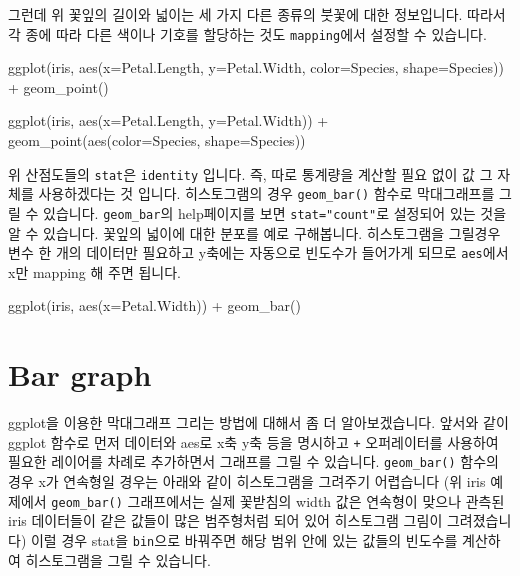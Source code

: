 \documentclass[
]{book}
\newenvironment{Shaded}{\begin{snugshade}}{\end{snugshade}}
\newcommand{\AttributeTok}[1]{\textcolor[rgb]{0.77,0.63,0.00}{#1}}
\newcommand{\FunctionTok}[1]{\textcolor[rgb]{0.00,0.00,0.00}{#1}}
\newcommand{\NormalTok}[1]{#1}
\newcommand{\SpecialCharTok}[1]{\textcolor[rgb]{0.00,0.00,0.00}{#1}}
\begin{document}
그런데 위 꽃잎의 길이와 넓이는 세 가지 다른 종류의 붓꽃에 대한 정보입니다. 따라서 각 종에 따라 다른 색이나 기호를 할당하는 것도 \texttt{mapping}에서 설정할 수 있습니다.

\begin{Shaded}
\begin{Highlighting}[]
\FunctionTok{ggplot}\NormalTok{(iris, }\FunctionTok{aes}\NormalTok{(}\AttributeTok{x=}\NormalTok{Petal.Length, }
                 \AttributeTok{y=}\NormalTok{Petal.Width, }
                 \AttributeTok{color=}\NormalTok{Species, }
                 \AttributeTok{shape=}\NormalTok{Species)) }\SpecialCharTok{+} 
  \FunctionTok{geom\_point}\NormalTok{()}

\FunctionTok{ggplot}\NormalTok{(iris, }\FunctionTok{aes}\NormalTok{(}\AttributeTok{x=}\NormalTok{Petal.Length, }\AttributeTok{y=}\NormalTok{Petal.Width)) }\SpecialCharTok{+} 
  \FunctionTok{geom\_point}\NormalTok{(}\FunctionTok{aes}\NormalTok{(}\AttributeTok{color=}\NormalTok{Species, }\AttributeTok{shape=}\NormalTok{Species))}
\end{Highlighting}
\end{Shaded}

위 산점도들의 \texttt{stat}은 \texttt{identity} 입니다. 즉, 따로 통계량을 계산할 필요 없이 값 그 자체를 사용하겠다는 것 입니다. 히스토그램의 경우 \texttt{geom\_bar()} 함수로 막대그래프를 그릴 수 있습니다. \texttt{geom\_bar}의 help페이지를 보면 \texttt{stat="count"}로 설정되어 있는 것을 알 수 있습니다. 꽃잎의 넓이에 대한 분포를 예로 구해봅니다. 히스토그램을 그릴경우 변수 한 개의 데이터만 필요하고 y축에는 자동으로 빈도수가 들어가게 되므로 \texttt{aes}에서 x만 mapping 해 주면 됩니다.

\begin{Shaded}
\begin{Highlighting}[]
\FunctionTok{ggplot}\NormalTok{(iris, }\FunctionTok{aes}\NormalTok{(}\AttributeTok{x=}\NormalTok{Petal.Width)) }\SpecialCharTok{+}  
  \FunctionTok{geom\_bar}\NormalTok{()}
\end{Highlighting}
\end{Shaded}

\hypertarget{bar-graph}{%
\section{Bar graph}\label{bar-graph}}

ggplot을 이용한 막대그래프 그리는 방법에 대해서 좀 더 알아보겠습니다. 앞서와 같이 ggplot 함수로 먼저 데이터와 aes로 x축 y축 등을 명시하고 \texttt{+} 오퍼레이터를 사용하여 필요한 레이어를 차례로 추가하면서 그래프를 그릴 수 있습니다. \texttt{geom\_bar()} 함수의 경우 x가 연속형일 경우는 아래와 같이 히스토그램을 그려주기 어렵습니다 (위 iris 예제에서 \texttt{geom\_bar()} 그래프에서는 실제 꽃받침의 width 값은 연속형이 맞으나 관측된 iris 데이터들이 같은 값들이 많은 범주형처럼 되어 있어 히스토그램 그림이 그려졌습니다) 이럴 경우 stat을 \texttt{bin}으로 바꿔주면 해당 범위 안에 있는 값들의 빈도수를 계산하여 히스토그램을 그릴 수 있습니다.
\end{document}
